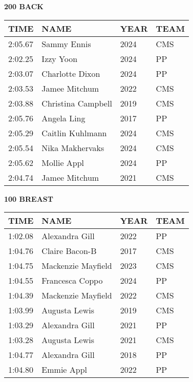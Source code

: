 \vspace{0.4cm}

\begin{minipage}[t]{0.48\textwidth}
\centering
\textbf{200 BACK}\\[0.05cm]
\begin{tabular}{@{}p{1.8cm}p{2.8cm}p{1.2cm}p{1.4cm}@{}}
\hline
\textbf{TIME} & \textbf{NAME} & \textbf{YEAR} & \textbf{TEAM} \\
\hline
2:05.67 & Sammy Ennis & 2024 & CMS \\
2:02.25 & Izzy Yoon & 2024 & PP \\
2:03.07 & Charlotte Dixon & 2024 & PP \\
2:03.53 & Jamee Mitchum & 2022 & CMS \\
2:03.88 & Christina Campbell & 2019 & CMS \\
2:05.76 & Angela Ling & 2017 & PP \\
2:05.29 & Caitlin Kuhlmann & 2024 & CMS \\
2:05.54 & Nika Makhervaks & 2024 & CMS \\
2:05.62 & Mollie Appl & 2024 & PP \\
2:04.74 & Jamee Mitchum & 2021 & CMS \\
\hline
\end{tabular}
\end{minipage}\hfill
\begin{minipage}[t]{0.48\textwidth}
\centering
\textbf{100 BREAST}\\[0.05cm]
\begin{tabular}{@{}p{1.8cm}p{2.8cm}p{1.2cm}p{1.4cm}@{}}
\hline
\textbf{TIME} & \textbf{NAME} & \textbf{YEAR} & \textbf{TEAM} \\
\hline
1:02.08 & Alexandra Gill & 2022 & PP \\
1:04.76 & Claire Bacon-B & 2017 & CMS \\
1:04.75 & Mackenzie Mayfield & 2023 & CMS \\
1:04.55 & Francesca Coppo & 2024 & PP \\
1:04.39 & Mackenzie Mayfield & 2022 & CMS \\
1:03.99 & Augusta Lewis & 2019 & CMS \\
1:03.29 & Alexandra Gill & 2021 & PP \\
1:03.28 & Augusta Lewis & 2021 & CMS \\
1:04.77 & Alexandra Gill & 2018 & PP \\
1:04.80 & Emmie Appl & 2022 & PP \\
\hline
\end{tabular}
\end{minipage}

